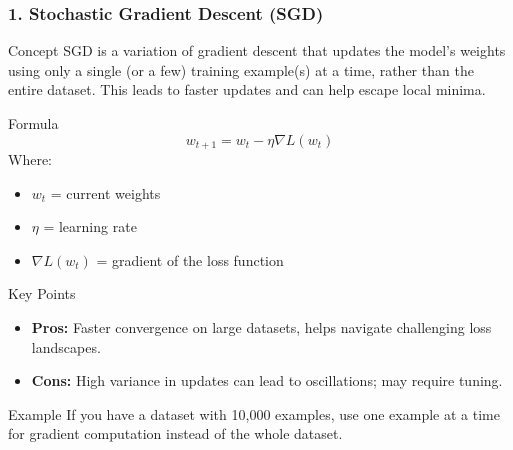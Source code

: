 \documentclass[aspectratio=169]{beamer}
\begin{document}
\begin{frame}[fragile]
    \frametitle{1. Stochastic Gradient Descent (SGD)}
    \begin{block}{Concept}
        SGD is a variation of gradient descent that updates the model's weights using only a single (or a few) training example(s) at a time, rather than the entire dataset. This leads to faster updates and can help escape local minima.
    \end{block}
    
    \begin{block}{Formula}
        \begin{equation}
            w_{t+1} = w_t - \eta \nabla L(w_t)
        \end{equation}
        Where:
        \begin{itemize}
            \item \(w_t\) = current weights
            \item \(\eta\) = learning rate
            \item \(\nabla L(w_t)\) = gradient of the loss function
        \end{itemize}
    \end{block}
    
    \begin{block}{Key Points}
        \begin{itemize}
            \item \textbf{Pros:} Faster convergence on large datasets, helps navigate challenging loss landscapes.
            \item \textbf{Cons:} High variance in updates can lead to oscillations; may require tuning.
        \end{itemize}
    \end{block}
    
    \begin{block}{Example}
        If you have a dataset with 10,000 examples, use one example at a time for gradient computation instead of the whole dataset.
    \end{block}
\end{frame}
\end{document}
